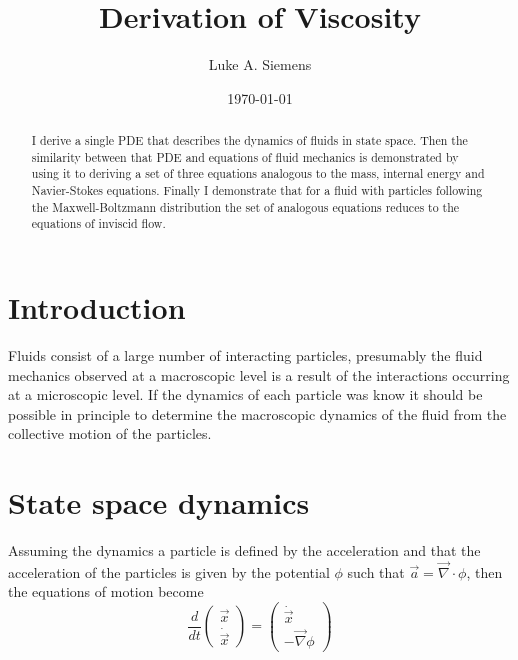 \documentclass[%
 twocolumn,
 amsmath,amssymb,
 aps,
]{revtex4-1}
\newcommand{\dvec}[1]{\dot{\vec{#1}}}
\newcommand{\grad}{\vec{\nabla}}
\begin{document}
\title{Derivation of Viscosity}%

\author{Luke A. Siemens}

\date{\today}

\begin{abstract}
I derive a single PDE that describes the dynamics of fluids in state space. Then the similarity between that PDE and equations of fluid mechanics is demonstrated by using it to deriving a set of three equations analogous to the mass, internal energy and Navier-Stokes equations.  Finally I demonstrate that for a fluid with particles following the Maxwell-Boltzmann distribution the set of analogous equations reduces to the equations of inviscid flow.
\end{abstract}

\maketitle

\section{Introduction}

Fluids consist of a large number of interacting particles, presumably the fluid mechanics observed at a macroscopic level is a result of the interactions occurring at a microscopic level. If the dynamics of each particle was know it should be possible in principle to determine the macroscopic dynamics of the fluid from the collective motion of the particles. 

\section{State space dynamics}

Assuming the dynamics a particle is defined by the acceleration and that the acceleration of the particles is given by the potential $\phi$ such that $\vec{a} = \vec{\nabla}\cdot\phi$, then the equations of motion become
\[
\frac{d}{dt}\begin{pmatrix} \vec{x} \\ \dvec{x} \end{pmatrix}=\begin{pmatrix} \dvec{x} \\ -\grad\phi \end{pmatrix}
\]
\end{document}
